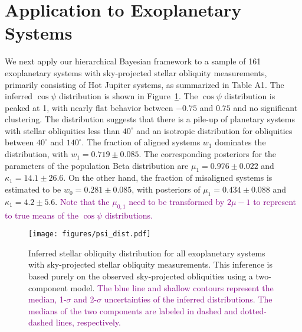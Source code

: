 \documentclass[twocolumn,times]{aastex631}
\newcommand{\edits}[1]{\textcolor{purple}{#1}}
\begin{document}
\section{Application to Exoplanetary Systems}\label{sec:observation}

We next apply our hierarchical Bayesian framework to a sample of 161 exoplanetary systems with sky-projected stellar obliquity measurements, primarily consisting of Hot Jupiter systems, as summarized in \cite{Albrecht22} Table A1.
The inferred $\cos{\psi}$ distribution is shown in Figure~\ref{fig:psi_dist}. The $\cos{\psi}$ distribution is peaked at 1, with nearly flat behavior between $-0.75$ and $0.75$ and no significant clustering. The distribution suggests that there is a pile-up of planetary systems with stellar obliquities less than $40^\circ$ and an isotropic distribution for obliquities between $40^\circ$ and $140^\circ$.
The fraction of aligned systems $w_1$ dominates the distribution, with $w_1 = 0.719 \pm 0.085$. The corresponding posteriors for the parameters of the population Beta distribution are $\mu_1 = 0.976 \pm 0.022$ and $\kappa_1 = 14.1 \pm 26.6$. On the other hand, the fraction of misaligned systems is estimated to be $w_0 = 0.281 \pm 0.085$, with posteriors of $\mu_1 = 0.434 \pm 0.088$ and $\kappa_1 = 4.2 \pm 5.6$. \edits{Note that the $\mu_{0,1}$ need to be transformed by $2\mu-1$ to represent to true means of the $\cos{\psi}$ distributions.}

\begin{figure}[ht!]
    \begin{centering}
        \texttt{[image: figures/psi\_dist.pdf]}
        \caption{Inferred stellar obliquity distribution for all exoplanetary systems with sky-projected stellar obliquity measurements. This inference is based purely on the observed sky-projected obliquities using a two-component model. \edits{The blue line and shallow contours represent the median, 1-$\sigma$ and 2-$\sigma$ uncertainties of the inferred distributions. The medians of the two components are labeled in dashed and dotted-dashed lines, respectively.}}
        \label{fig:psi_dist}
    \end{centering}
\end{figure}
\end{document}
